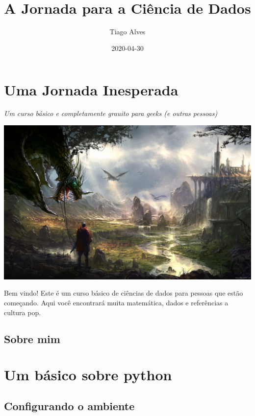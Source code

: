 \documentclass[]{book}
\title{A Jornada para a Ciência de Dados}
\author{Tiago Alves}
\date{2020-04-30}
\begin{document}
\maketitle

{
\setcounter{tocdepth}{1}
\tableofcontents
}
\hypertarget{uma-jornada-inesperada}{%
\chapter{Uma Jornada Inesperada}\label{uma-jornada-inesperada}}

\emph{Um curso básico e completamente grauito para geeks (e outras pessoas)}

\includegraphics{images/index.jpg}

Bem vindo! Este é um curso básico de ciências de dados para pessoas que estão começando.
Aqui você encontrará muita matemática, dados e referências a cultura pop.

\hypertarget{sobre-mim}{%
\section{Sobre mim}\label{sobre-mim}}

\hypertarget{um-buxe1sico-sobre-python}{%
\chapter{Um básico sobre python}\label{um-buxe1sico-sobre-python}}

\hypertarget{configurando-o-ambiente}{%
\section{Configurando o ambiente}\label{configurando-o-ambiente}}
\end{document}
